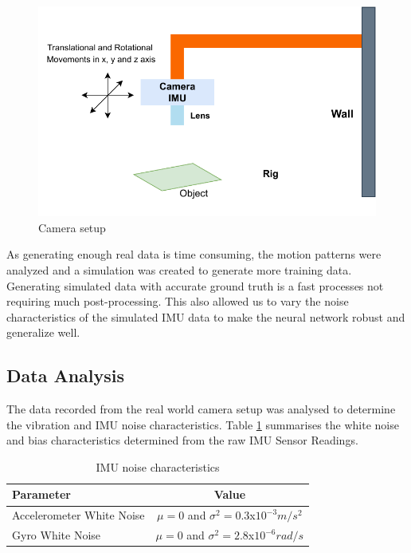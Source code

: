 \begin{figure}[H]
    \centering
    \includegraphics[scale=0.65]{images/fig_chapter4/camera_rig.pdf}
    \caption{Camera setup}
    \label{fig:camera_rig}
\end{figure}

As generating enough real data is time consuming, the motion patterns were analyzed and a simulation was created to generate more training data. Generating simulated data with accurate ground truth is a fast processes not requiring much post-processing. This also allowed us to vary the noise characteristics of the simulated IMU data to make the neural network robust and generalize well.

\subsection{Data Analysis}
\label{sec:data_analysis}
The data recorded from the real world camera setup was analysed to determine the vibration and IMU noise characteristics. Table \ref{tab:imu_noise_characteristics} summarises the white noise and bias characteristics determined from the raw IMU Sensor Readings. 


\begin{table}[H]
\centering
\begin{tabular}{| l|c |}
    \hline
    
    \textbf{Parameter} & \textbf{Value} \\ \hline
    Accelerometer White Noise & $ \mu = 0 $ and $ \sigma^{2}=0.3$x$10^{-3} m/s^{2}$  \\  
    Gyro White Noise & $ \mu = 0 $ and $ \sigma^{2}=2.8$x$10^{-6} rad/s$ \\

    \hline
    
\end{tabular}
\caption{IMU noise characteristics}
\label{tab:imu_noise_characteristics}
\end{table}


